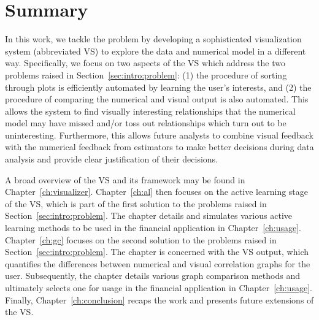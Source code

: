 \section{Summary}
\label{sec:intro:summary}

In this work, we tackle the problem by developing a sophisticated visualization system (abbreviated VS) to explore the data and numerical model in a different way. Specifically, we focus on two aspects of the VS which address the two problems raised in Section~\ref{sec:intro:problem}: (1) the procedure of sorting through plots is efficiently automated by learning the user's interests, and (2) the procedure of comparing the numerical and visual output is also automated. This allows the system to find visually interesting relationships that the numerical model may have missed and/or toss out relationships which turn out to be uninteresting. Furthermore, this allows future analysts to combine visual feedback with the numerical feedback from estimators to make better decisions during data analysis and provide clear justification of their decisions.

A broad overview of the VS and its framework may be found in Chapter~\ref{ch:visualizer}. Chapter~\ref{ch:al} then focuses on the active learning stage of the VS, which is part of the first solution to the problems raised in Section~\ref{sec:intro:problem}. The chapter details and simulates various active learning methods to be used in the financial application in Chapter~\ref{ch:usage}. Chapter~\ref{ch:gc} focuses on the second solution to the problems raised in Section~\ref{sec:intro:problem}. The chapter is concerned with the VS output, which quantifies the differences between numerical and visual correlation graphs for the user. Subsequently, the chapter details various graph comparison methods and ultimately selects one for usage in the financial application in Chapter~\ref{ch:usage}. Finally, Chapter~\ref{ch:conclusion} recaps the work and presents future extensions of the VS.
